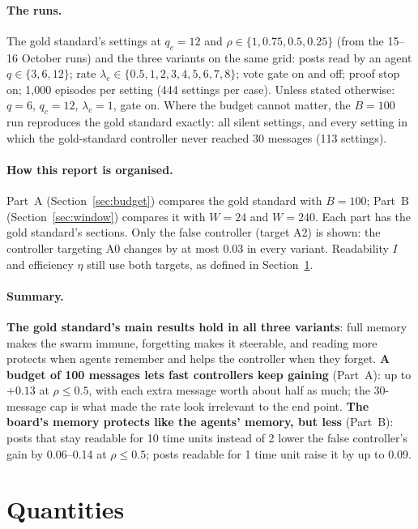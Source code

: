 \documentclass[10pt,a4paper]{article}
\begin{document}
\paragraph{The runs.} The gold standard's settings at $q_c = 12$ and $\rho \in \{1, 0.75, 0.5, 0.25\}$ (from the
15--16 October runs) and the three variants on the same grid: posts read by an agent $q \in \{3, 6, 12\}$; rate
$\lambda_c \in \{0.5, 1, 2, 3, 4, 5, 6, 7, 8\}$; vote gate on and off; proof stop on; 1{,}000 episodes per setting
(444 settings per case). Unless stated otherwise: $q = 6$, $q_c = 12$, $\lambda_c = 1$, gate on. Where the budget
cannot matter, the $B = 100$ run reproduces the gold standard exactly: all silent settings, and every setting in
which the gold-standard controller never reached 30 messages (113 settings).

\paragraph{How this report is organised.} Part~A (Section~\ref{sec:budget}) compares the gold standard with
$B = 100$; Part~B (Section~\ref{sec:window}) compares it with $W = 24$ and $W = 240$. Each part has the gold standard's
sections. Only the false controller (target A2) is shown: the controller targeting A0 changes by at most 0.03 in
every variant. Readability $I$ and efficiency $\eta$ still use both targets, as defined in Section~\ref{sec:quantities}.

\paragraph{Summary.} \textbf{The gold standard's main results hold in all three variants}: full memory makes the
swarm immune, forgetting makes it steerable, and reading more protects when agents remember and helps the controller
when they forget. \textbf{A budget of 100 messages lets fast controllers keep gaining} (Part~A): up to $+0.13$ at
$\rho \le 0.5$, with each extra message worth about half as much; the 30-message cap is what made the rate look
irrelevant to the end point. \textbf{The board's memory protects like the agents' memory, but less} (Part~B): posts
that stay readable for 10 time units instead of 2 lower the false controller's gain by 0.06--0.14 at $\rho \le 0.5$;
posts readable for 1 time unit raise it by up to 0.09.

\section{Quantities}\label{sec:quantities}
\end{document}
